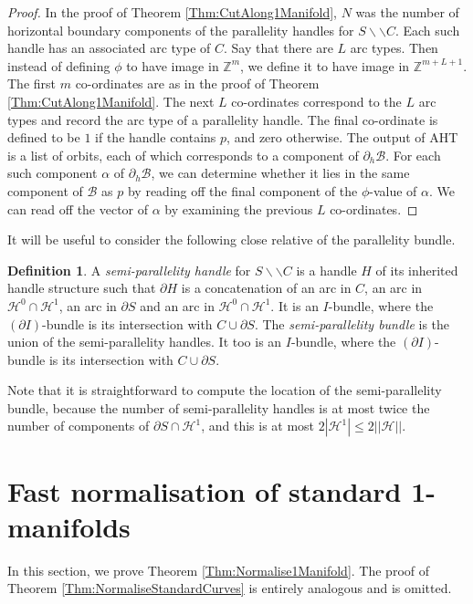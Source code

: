 \documentclass[oneside]{amsart}
\numberwithin{equation}{section}
\theoremstyle{plain}
\theoremstyle{definition}
\newtheorem{definition}[equation]{Definition}
\newcommand{\cut}{\backslash\backslash}
\newcommand{\calH}{\mathcal{H}}
\newcommand{\calB}{\mathcal{B}}
\begin{document}
\begin{proof} In the proof of Theorem \ref{Thm:CutAlong1Manifold}, $N$ was the number of horizontal boundary components of the parallelity handles for $S \cut C$. Each such handle has an associated arc type of $C$. Say that there are $L$ arc types. Then instead of defining $\phi$ to have image in $\mathbb{Z}^m$, we define it to have image in $\mathbb{Z}^{m+L+1}$. The first $m$ co-ordinates are as in the proof of Theorem \ref{Thm:CutAlong1Manifold}. The next $L$ co-ordinates correspond to the $L$ arc types and record the arc type of a parallelity handle. The final co-ordinate is defined to be $1$ if the handle contains $p$, and zero otherwise. The output of {\sc AHT} is a list of orbits, each of which corresponds to a component of $\partial_h \calB$. For each such component $\alpha$ of $\partial_h \calB$, we can determine whether it lies in the same component of $\calB$ as $p$ by reading off the final component of the $\phi$-value of $\alpha$. We can read off the vector of $\alpha$ by examining the previous $L$ co-ordinates.
\end{proof}

It will be useful to consider the following close relative of the parallelity bundle.

\begin{definition} 
A \emph{semi-parallelity handle} for $S \cut C$ is a handle $H$ of its inherited handle structure such that $\partial H$ is a concatenation of an arc in $C$, an arc in $\calH^0 \cap \calH^1$, an arc in $\partial S$ and an arc in $\calH^0 \cap \calH^1$. It is an $I$-bundle, where the $(\partial I)$-bundle is its intersection with $C \cup \partial S$. The \emph{semi-parallelity bundle} is the union of the semi-parallelity handles. It too is an $I$-bundle, where the $(\partial I)$-bundle is its intersection with $C \cup \partial S$.
\end{definition}

Note that it is straightforward to compute the location of the semi-parallelity bundle, because the number of semi-parallelity handles is at most twice the number of components of $\partial S \cap \calH^1$, and this is at most $2|\calH^1| \leq 2 ||\calH||$.

\section{Fast normalisation of standard 1-manifolds}
\label{Sec:Normalise}


In this section, we prove Theorem \ref{Thm:Normalise1Manifold}. The proof of Theorem \ref{Thm:NormaliseStandardCurves} is entirely analogous and is omitted.
\end{document}
